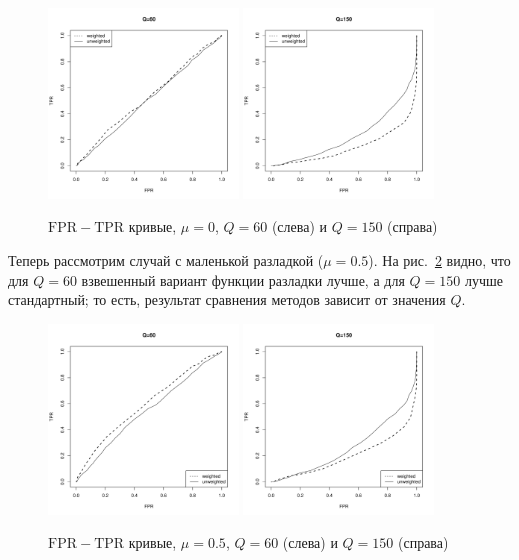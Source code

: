 \documentclass{math-mech-sci}
\begin{document}
\begin{figure}[h]
	\includegraphics[width=0.45\textwidth]{def_10}
	\includegraphics[width=0.45\textwidth]{def_100}\caption{$\mathrm{FPR}-\mathrm{TPR}$ кривые, $\mu=0$, $Q=60$ (слева) и $Q=150$ (справа)}\label{fig:def}
\end{figure}

Теперь рассмотрим случай с маленькой разладкой ($\mu=0.5$). На рис.~\ref{fig:ex} видно, что для $Q=60$ взвешенный вариант функции разладки лучше, а для $Q=150$ лучше стандартный; то есть, результат сравнения методов зависит от значения $Q$.


\begin{figure}[h]
	\includegraphics[width=0.45\textwidth]{ex_10}
	\includegraphics[width=0.45\textwidth]{ex_100}\caption{$\mathrm{FPR}-\mathrm{TPR}$ кривые, $\mu=0.5$, $Q=60$ (слева) и $Q=150$ (справа)}\label{fig:ex}
\end{figure}
\end{document}
